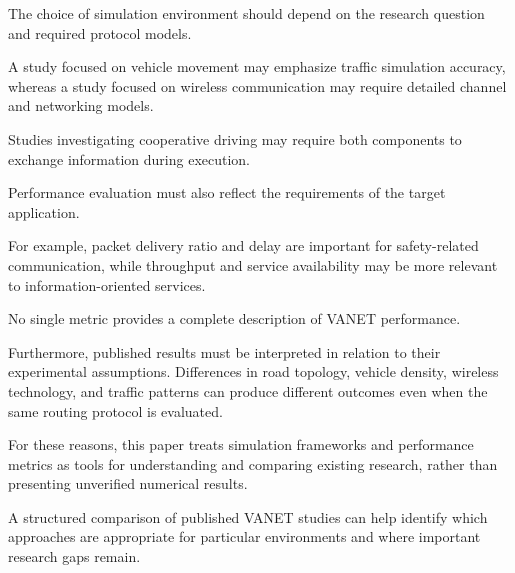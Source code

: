 The choice of simulation
environment should depend
on the research question
and required protocol models.

A study focused on vehicle
movement may emphasize
traffic simulation accuracy,
whereas a study focused on
wireless communication may
require detailed channel
and networking models.

Studies investigating
cooperative driving may
require both components
to exchange information
during execution.

Performance evaluation
must also reflect the
requirements of the
target application.

For example, packet delivery
ratio and delay are important
for safety-related communication,
while throughput and service
availability may be more relevant
to information-oriented services.

No single metric provides
a complete description
of VANET performance.

Furthermore, published results
must be interpreted in relation
to their experimental assumptions.
Differences in road topology,
vehicle density, wireless
technology, and traffic patterns
can produce different outcomes
even when the same routing
protocol is evaluated.

For these reasons, this paper
treats simulation frameworks
and performance metrics as
tools for understanding and
comparing existing research,
rather than presenting
unverified numerical results.

A structured comparison of
published VANET studies can
help identify which approaches
are appropriate for particular
environments and where
important research gaps remain.
